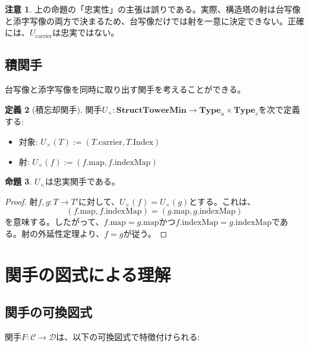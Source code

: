 \documentclass[a4paper,12pt]{article}
\theoremstyle{definition}
\newtheorem{definition}{定義}[section]
\newtheorem{proposition}[definition]{命題}
\newtheorem{remark}[definition]{注意}
\begin{document}
\begin{remark}
上の命題の「忠実性」の主張は誤りである。実際、構造塔の射は台写像と添字写像の両方で決まるため、台写像だけでは射を一意に決定できない。正確には、$U_{\text{carrier}}$は忠実ではない。
\end{remark}

\subsection{積関手}

台写像と添字写像を同時に取り出す関手を考えることができる。

\begin{definition}[積忘却関手]
関手$U_{\times} : \mathbf{StructTowerMin} \to \mathbf{Type}_u \times \mathbf{Type}_v$を次で定義する:
\begin{itemize}
\item 対象: $U_{\times}(T) := (T.\text{carrier}, T.\text{Index})$
\item 射: $U_{\times}(f) := (f.\text{map}, f.\text{indexMap})$
\end{itemize}
\end{definition}

\begin{proposition}
$U_{\times}$は忠実関手である。
\end{proposition}

\begin{proof}
射$f, g : T \to T'$に対して、$U_{\times}(f) = U_{\times}(g)$とする。これは、
\[
(f.\text{map}, f.\text{indexMap}) = (g.\text{map}, g.\text{indexMap})
\]
を意味する。したがって、$f.\text{map} = g.\text{map}$かつ$f.\text{indexMap} = g.\text{indexMap}$である。射の外延性定理より、$f = g$が従う。
\end{proof}

\section{関手の図式による理解}

\subsection{関手の可換図式}

関手$F : \mathcal{C} \to \mathcal{D}$は、以下の可換図式で特徴付けられる:

\begin{center}
\end{center}
\end{document}

